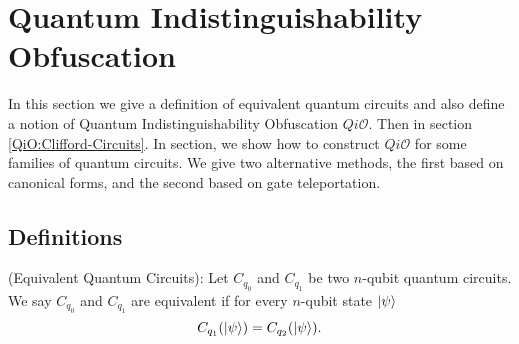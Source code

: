 
\section{Quantum Indistinguishability Obfuscation}
\label{sec:QiO-Cliffords and more}
In this section we give a definition of equivalent quantum circuits and also define a notion of Quantum Indistinguishability Obfuscation $Qi\mathcal{O}.$ Then in section \ref{QiO:Clifford-Circuits}. In section, we show how to construct $Qi\mathcal{O}$ for some families of quantum circuits. We give two alternative methods, the first based on canonical forms, and the second based on gate teleportation. 


\subsection{Definitions}
\label{def:equivalent-circuits}
\begin{definition} {\rm (Equivalent Quantum Circuits):}
Let $C_{q_0}$ and $C_{q_1}$ be two $n$-qubit quantum circuits. We say $C_{q_0}$ and $C_{q_1}$ are equivalent if for every $n$-qubit state ${\lvert}\psi\rangle$
$$C_{q_1}({\lvert}\psi\rangle) =C_{q_2}({\lvert}\psi\rangle).$$
\end{definition}

